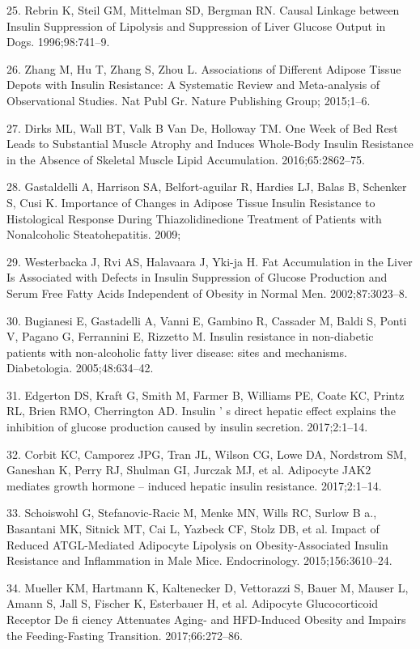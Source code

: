 \documentclass[11pt]{article} %
\begin{document}
25. Rebrin K, Steil GM, Mittelman SD, Bergman RN. Causal Linkage between
Insulin Suppression of Lipolysis and Suppression of Liver Glucose Output
in Dogs. 1996;98:741--9.

26. Zhang M, Hu T, Zhang S, Zhou L. Associations of Different Adipose
Tissue Depots with Insulin Resistance: A Systematic Review and
Meta-analysis of Observational Studies. Nat Publ Gr. Nature Publishing
Group; 2015;1--6.

27. Dirks ML, Wall BT, Valk B Van De, Holloway TM. One Week of Bed Rest
Leads to Substantial Muscle Atrophy and Induces Whole-Body Insulin
Resistance in the Absence of Skeletal Muscle Lipid Accumulation.
2016;65:2862--75.

28. Gastaldelli A, Harrison SA, Belfort-aguilar R, Hardies LJ, Balas B,
Schenker S, Cusi K. Importance of Changes in Adipose Tissue Insulin
Resistance to Histological Response During Thiazolidinedione Treatment
of Patients with Nonalcoholic Steatohepatitis. 2009;

29. Westerbacka J, Rvi AS, Halavaara J, Yki-ja H. Fat Accumulation in
the Liver Is Associated with Defects in Insulin Suppression of Glucose
Production and Serum Free Fatty Acids Independent of Obesity in Normal
Men. 2002;87:3023--8.

30. Bugianesi E, Gastadelli A, Vanni E, Gambino R, Cassader M, Baldi S,
Ponti V, Pagano G, Ferrannini E, Rizzetto M. Insulin resistance in
non-diabetic patients with non-alcoholic fatty liver disease: sites and
mechanisms. Diabetologia. 2005;48:634--42.

31. Edgerton DS, Kraft G, Smith M, Farmer B, Williams PE, Coate KC,
Printz RL, Brien RMO, Cherrington AD. Insulin ' s direct hepatic effect
explains the inhibition of glucose production caused by insulin
secretion. 2017;2:1--14.

32. Corbit KC, Camporez JPG, Tran JL, Wilson CG, Lowe DA, Nordstrom SM,
Ganeshan K, Perry RJ, Shulman GI, Jurczak MJ, et al. Adipocyte JAK2
mediates growth hormone -- induced hepatic insulin resistance.
2017;2:1--14.

33. Schoiswohl G, Stefanovic-Racic M, Menke MN, Wills RC, Surlow B a.,
Basantani MK, Sitnick MT, Cai L, Yazbeck CF, Stolz DB, et al. Impact of
Reduced ATGL-Mediated Adipocyte Lipolysis on Obesity-Associated Insulin
Resistance and Inflammation in Male Mice. Endocrinology.
2015;156:3610--24.

34. Mueller KM, Hartmann K, Kaltenecker D, Vettorazzi S, Bauer M, Mauser
L, Amann S, Jall S, Fischer K, Esterbauer H, et al. Adipocyte
Glucocorticoid Receptor De fi ciency Attenuates Aging- and HFD-Induced
Obesity and Impairs the Feeding-Fasting Transition. 2017;66:272--86.
\end{document}
